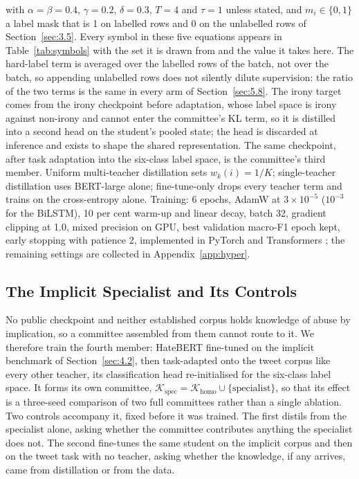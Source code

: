 with $\alpha = \beta = 0.4$, $\gamma = 0.2$, $\delta = 0.3$, $T = 4$ and $\tau = 1$ unless stated,
and $m_i \in \{0, 1\}$ a label mask that is 1 on labelled rows and 0 on the unlabelled rows of
Section~\ref{sec:3.5}. Every symbol in these five equations appears in Table~\ref{tab:symbols} with
the set it is drawn from and the value it takes here. The hard-label term is averaged over the
labelled rows of the batch, not over the batch, so appending unlabelled rows does not silently
dilute supervision: the ratio of the two terms is the same in every arm of Section~\ref{sec:5.8}.
The irony target comes from the irony checkpoint before adaptation, whose label space is irony
against non-irony and cannot enter the committee's KL term, so it is distilled into a second head on
the student's pooled state; the head is discarded at inference and exists to shape the shared
representation. The same checkpoint, after task adaptation into the six-class label space, is the
committee's third member. Uniform multi-teacher distillation sets $w_k(i) = 1/K$; single-teacher
distillation uses BERT-large alone; fine-tune-only drops every teacher term and trains on the
cross-entropy alone. Training: 6 epochs, AdamW \cite{loshchilov2019decoupled} at $3 \times 10^{-5}$
($10^{-3}$ for the BiLSTM), 10 per cent warm-up and linear decay, batch 32, gradient clipping at
1.0, mixed precision on GPU, best validation macro-F1 epoch kept, early stopping with patience 2,
implemented in PyTorch and Transformers \cite{paszke2019pytorch, wolf2020transformers}; the
remaining settings are collected in Appendix~\ref{app:hyper}.
\subsection{The Implicit Specialist and Its Controls}
\label{sec:3.4}
No public checkpoint and neither established corpus holds knowledge of abuse by implication, so a
committee assembled from them cannot route to it. We therefore train the fourth member: HateBERT
fine-tuned on the implicit benchmark of Section~\ref{sec:4.2}, then task-adapted onto the tweet
corpus like every other teacher, its classification head re-initialised for the six-class label
space. It forms its own committee, $\mathcal{K}_{\text{spec}} = \mathcal{K}_{\text{homo}} \cup
\{\text{specialist}\}$, so that its effect is a three-seed comparison of two full committees rather
than a single ablation. Two controls accompany it, fixed before it was trained. The first distils
from the specialist alone, asking whether the committee contributes anything the specialist does
not. The second fine-tunes the same student on the implicit corpus and then on the tweet task with
no teacher, asking whether the knowledge, if any arrives, came from distillation or from the data.
